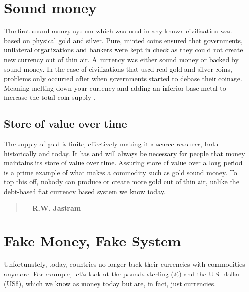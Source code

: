 \section{Sound money}
The first sound money system which was used in any known civilization was based on physical gold and silver. Pure, minted coins ensured that governments, unilateral organizations and bankers were kept in check as they could not create new currency out of thin air. A currency was either sound money or backed by sound money. In the case of civilizations that used real gold and silver coins, problems only occurred after when governments started to debase their coinage. Meaning melting down your currency and adding an inferior base metal to increase the total coin supply \parencite{goldsilver_ep1}.

\subsection*{Store of value over time}
The supply of gold is finite, effectively making it a scarce resource, both historically and today. It has and will always be necessary for people that money maintains its store of value over time. Assuring store of value over a long period is a prime example of what makes a commodity such as gold sound money. To top this off, nobody can produce or create more gold out of thin air, unlike the debt-based fiat currency based system we know today.


\begin{quotation}

      \textit{}
      \begin{flushright}
        \small{--- \textbf{R.W. Jastram}}
      \end{flushright}
    
\end{quotation}




\section{Fake Money, Fake System}
Unfortunately, today, countries no longer back their currencies with commodities anymore. For example, let's look at the pounds sterling (\pounds) and the U.S. dollar (US\$), which we know as money today but are, in fact, just currencies.\medskip

